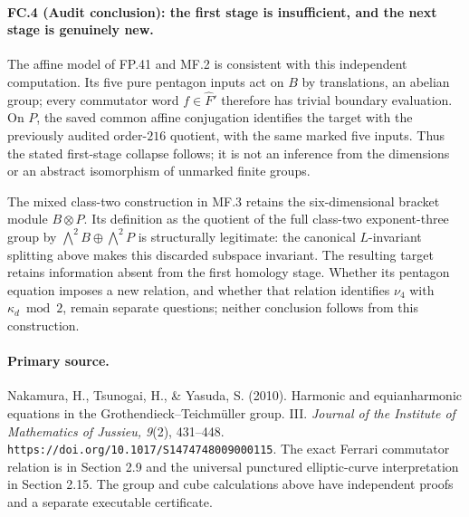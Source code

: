 \paragraph{FC.4 (Audit conclusion): the first stage is insufficient, and the next stage is genuinely new.}
The affine model of FP.41 and MF.2 is consistent with this
independent computation. Its five pure pentagon inputs act on
$B$ by translations, an abelian group; every commutator word
$f\in\widehat F'$ therefore has trivial boundary evaluation.
On $P$, the saved common affine conjugation identifies the
target with the previously audited order-$216$ quotient, with
the same marked five inputs. Thus the stated first-stage
collapse follows; it is not an inference from the dimensions
or an abstract isomorphism of unmarked finite groups.

The mixed class-two construction in MF.3 retains the six-dimensional
bracket module $B\otimes P$. Its definition as the quotient of
the full class-two exponent-three group by
$\bigwedge^2B\oplus\bigwedge^2P$ is structurally legitimate:
the canonical $L$-invariant splitting above makes this discarded
subspace invariant. The resulting target retains information
absent from the first homology stage. Whether its pentagon
equation imposes a new relation, and whether that relation
identifies $\nu_4$ with $\kappa_d\bmod2$, remain separate
questions; neither conclusion follows from this construction.

\paragraph{Primary source.}
Nakamura, H., Tsunogai, H., \& Yasuda, S. (2010).
Harmonic and equianharmonic equations in the
Grothendieck--Teichm\"uller group. III.
\emph{Journal of the Institute of Mathematics of Jussieu, 9}(2),
431--448. \texttt{https://doi.org/10.1017/S1474748009000115}.
The exact Ferrari commutator relation is in Section 2.9 and
the universal punctured elliptic-curve interpretation in
Section 2.15. The group and cube calculations above have
independent proofs and a separate executable certificate.

